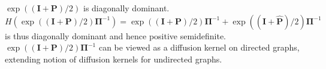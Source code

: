 $\exp((\mathbf{I} + \mathbf{P})/2)$ is diagonally
dominant. $H(\exp((\mathbf{I} + \mathbf{P})/2)\bm{\Pi}^{-1}) =
\exp((\mathbf{I} + \mathbf{P})/2)\bm{\Pi}^{-1} + \exp((\mathbf{I} +
\hat{\mathbf{P}})/2)\bm{\Pi}^{-1}$ is thus diagonally dominant and
hence positive semidefinite. $\exp((\mathbf{I} +
\mathbf{P})/2)\bm{\Pi}^{-1}$ can be viewed as a diffusion kernel on
directed graphs, extending \citet{kondor02:_diffus} notion of
diffusion kernels for undirected graphs.
